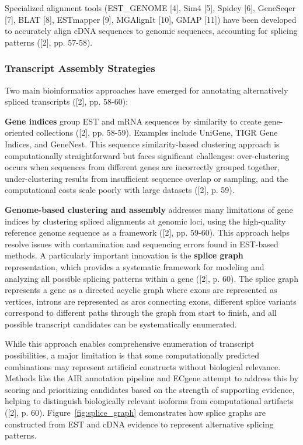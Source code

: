 \documentclass[12pt,a4paper]{article}
\begin{document}
Specialized alignment tools (EST\_GENOME [4], Sim4 [5], Spidey [6], GeneSeqer [7], BLAT [8], ESTmapper [9], MGAlignIt [10], GMAP [11]) have been developed to accurately align cDNA sequences to genomic sequences, accounting for splicing patterns ([2], pp. 57-58).

\subsubsection{Transcript Assembly Strategies}

Two main bioinformatics approaches have emerged for annotating alternatively spliced transcripts ([2], pp. 58-60):

\textbf{Gene indices} group EST and mRNA sequences by similarity to create gene-oriented collections ([2], pp. 58-59). Examples include UniGene, TIGR Gene Indices, and GeneNest. This sequence similarity-based clustering approach is computationally straightforward but faces significant challenges: over-clustering occurs when sequences from different genes are incorrectly grouped together, under-clustering results from insufficient sequence overlap or sampling, and the computational costs scale poorly with large datasets ([2], p. 59).

\textbf{Genome-based clustering and assembly} addresses many limitations of gene indices by clustering spliced alignments at genomic loci, using the high-quality reference genome sequence as a framework ([2], pp. 59-60). This approach helps resolve issues with contamination and sequencing errors found in EST-based methods. A particularly important innovation is the \textbf{splice graph} representation, which provides a systematic framework for modeling and analyzing all possible splicing patterns within a gene ([2], p. 60). The splice graph represents a gene as a directed acyclic graph where exons are represented as vertices, introns are represented as arcs connecting exons, different splice variants correspond to different paths through the graph from start to finish, and all possible transcript candidates can be systematically enumerated.

While this approach enables comprehensive enumeration of transcript possibilities, a major limitation is that some computationally predicted combinations may represent artificial constructs without biological relevance. Methods like the AIR annotation pipeline and ECgene attempt to address this by scoring and prioritizing candidates based on the strength of supporting evidence, helping to distinguish biologically relevant isoforms from computational artifacts ([2], p. 60). Figure~\ref{fig:splice_graph} demonstrates how splice graphs are constructed from EST and cDNA evidence to represent alternative splicing patterns.
\end{document}
